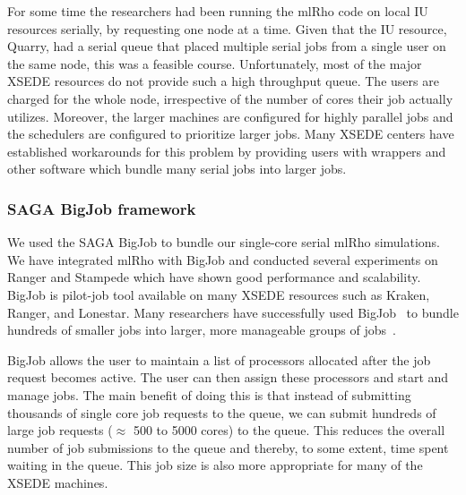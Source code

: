 \documentclass{sig-alternate}
\begin{document}
For some time the researchers had been running the mlRho code on local IU resources serially, by requesting
one node at a time. Given that the IU resource, Quarry, had a serial queue that placed multiple serial jobs from
a single user on the same node, this was a feasible course. Unfortunately, most of the major XSEDE resources do
not provide such a high throughput queue. The users are charged for the whole node, irrespective of the number
of cores their job actually utilizes. Moreover, the larger machines are configured for highly parallel jobs and
the schedulers are configured to prioritize larger jobs. Many XSEDE centers have established workarounds for this
problem by providing users with wrappers and other software which bundle many serial jobs into larger jobs.


\subsubsection{SAGA BigJob framework}
\label{sec:bigjob}

We used the SAGA BigJob to bundle our single-core serial mlRho simulations. We have integrated mlRho with
BigJob and conducted several experiments on Ranger and Stampede which have shown good performance and
scalability.  BigJob is pilot-job tool available on many XSEDE resources such as Kraken, Ranger, and
Lonestar. Many researchers have successfully used BigJob~\cite{saga_bigjob_condor_cloud} to bundle hundreds of smaller jobs
into larger, more manageable groups of jobs~\cite{Luckow:2008fp, async_repex11}.

BigJob allows the user to maintain a list of processors allocated after the job request becomes active. The
user can then assign these processors and start and manage jobs. The main benefit of doing this is that instead of submitting
thousands of single core job requests to the queue, we can submit hundreds of large job requests ($\approx$
500 to 5000 cores) to the queue. This reduces the overall number of job submissions to the queue and thereby,
to some extent, time spent waiting in the queue. This job size is also more appropriate for many of the XSEDE
machines.
\end{document}
